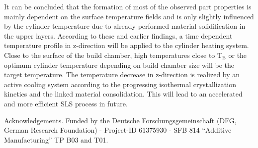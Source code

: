 \documentclass[10pt]{article}
\begin{document}
It can be concluded that the formation of most of the observed part properties is mainly dependent on the surface temperature fields and is only slightly influenced by the cylinder temperature due to already performed material solidification in the upper layers. According to these and earlier findings, a time dependent temperature profile in z-direction will be applied to the cylinder heating system. Close to the surface of the build chamber, high temperatures close to $\mathrm{T}_{\mathrm{B}}$ or the optimum cylinder temperature depending on build chamber size will be the target temperature. The temperature decrease in z-direction is realized by an active cooling system according to the progressing isothermal crystallization kinetics and the linked material consolidation. This will lead to an accelerated and more efficient SLS process in future.

Acknowledgements. Funded by the Deutsche Forschungsgemeinschaft (DFG, German Research Foundation) - Project-ID 61375930 - SFB 814 “Additive Manufacturing” TP B03 and T01.
\end{document}
